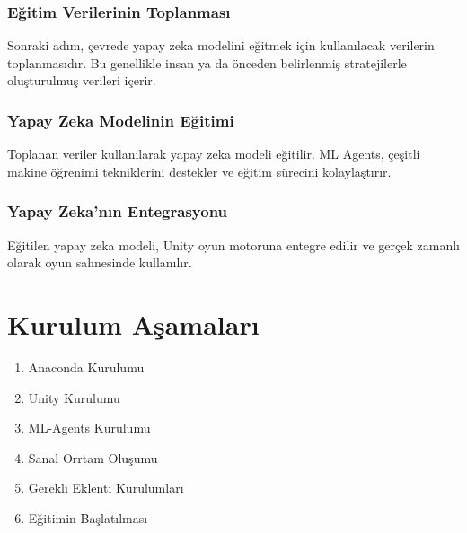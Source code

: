 \documentclass{article}
\begin{document}
\subsubsection{Eğitim Verilerinin Toplanması}
Sonraki adım, çevrede yapay zeka modelini eğitmek için kullanılacak verilerin toplanmasıdır. Bu genellikle insan ya da önceden belirlenmiş stratejilerle oluşturulmuş verileri içerir.

\subsubsection{Yapay Zeka Modelinin Eğitimi}
Toplanan veriler kullanılarak yapay zeka modeli eğitilir. ML Agents, çeşitli makine öğrenimi tekniklerini destekler ve eğitim sürecini kolaylaştırır.

\subsubsection{Yapay Zeka'nın Entegrasyonu}
Eğitilen yapay zeka modeli, Unity oyun motoruna entegre edilir ve gerçek zamanlı olarak oyun sahnesinde kullanılır.
\clearpage
\section{Kurulum Aşamaları}
\begin{enumerate}
    \item Anaconda Kurulumu
    \item Unity Kurulumu
    \item ML-Agents Kurulumu
    \item Sanal Orrtam Oluşumu
    \item Gerekli Eklenti Kurulumları
    \item Eğitimin Başlatılması
\end{enumerate}
\end{document}

